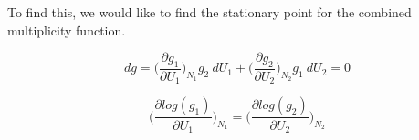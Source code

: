 To find this, we would like to find the stationary point for the combined multiplicity function.

\begin{equation}
dg = \bigg(\frac{\partial g_1}{\partial U_1}\bigg)_{N_1} g_2~dU_1 +
     \bigg(\frac{\partial g_2}{\partial U_2}\bigg)_{N_2} g_1~dU_2 = 0  
\label{eq:maxg}
\end{equation}

\begin{equation}
\bigg(\frac{\partial log(g_1)}{\partial U_1}\bigg)_{N_1} = 
\bigg(\frac{\partial log(g_2)}{\partial U_2}\bigg)_{N_2}
\label{eq:maxmicro}
\end{equation}
